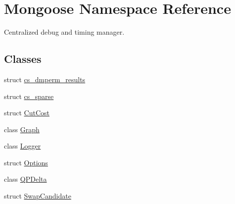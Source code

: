 \hypertarget{namespace_mongoose}{}\section{Mongoose Namespace Reference}
\label{namespace_mongoose}


Centralized debug and timing manager.  


\subsection*{Classes}
\begin{DoxyCompactItemize}
\item 
struct \hyperlink{struct_mongoose_1_1cs__dmperm__results}{cs\+\_\+dmperm\+\_\+results}
\item 
struct \hyperlink{struct_mongoose_1_1cs__sparse}{cs\+\_\+sparse}
\item 
struct \hyperlink{struct_mongoose_1_1_cut_cost}{Cut\+Cost}
\item 
class \hyperlink{class_mongoose_1_1_graph}{Graph}
\item 
class \hyperlink{class_mongoose_1_1_logger}{Logger}
\item 
struct \hyperlink{struct_mongoose_1_1_options}{Options}
\item 
class \hyperlink{class_mongoose_1_1_q_p_delta}{Q\+P\+Delta}
\item 
struct \hyperlink{struct_mongoose_1_1_swap_candidate}{Swap\+Candidate}
\end{DoxyCompactItemize}
